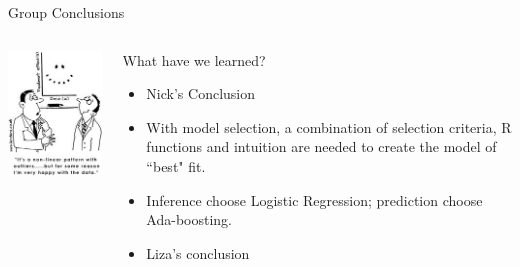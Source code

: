 \documentclass[table]{beamer}\usepackage[]{graphicx}\usepackage[]{color}
\begin{document}
\begin{frame}{Group Conclusions}
\begin{columns}[t]
\begin{column}[t]{4cm}

\includegraphics[width=\textwidth]{happy}

\end{column}


\begin{column}[t]{8cm}
What have we learned? 

\begin{itemize}
    \item Nick's Conclusion
  \item With model selection, a combination of selection criteria, R functions and intuition are needed to create the model of ``best" fit. 
  \item Inference choose Logistic Regression; prediction choose Ada-boosting.
  \item Liza's conclusion
\end{itemize}
\end{column}
\end{columns}
\end{frame}

\end{document}
